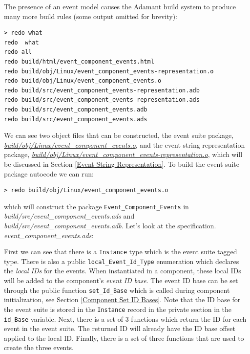 The presence of an event model causes the Adamant build system to produce many more build rules (some output omitted for brevity):

\vspace{5mm} %
\begin{verbatim}
> redo what 
redo  what
redo all
redo build/html/event_component_events.html
redo build/obj/Linux/event_component_events-representation.o
redo build/obj/Linux/event_component_events.o
redo build/src/event_component_events-representation.adb
redo build/src/event_component_events-representation.ads
redo build/src/event_component_events.adb
redo build/src/event_component_events.ads
\end{verbatim}
\vspace{5mm} %

We can see two object files that can be constructed, the event suite package, \textit{\url{build/obj/Linux/event\_component\_events.o}}, and the event string representation package, \textit{\url{build/obj/Linux/event\_component\_events-representation.o}}, which will be discussed in Section \ref{Event String Representation}. To build the event suite package autocode we can run:

\vspace{5mm} %
\begin{verbatim}
> redo build/obj/Linux/event_component_events.o
\end{verbatim}
\vspace{5mm} %

which will construct the package \texttt{Event\_Component\_Events} in \textit{build/src/event\_component\_events.ads} and \textit{build/src/event\_component\_events.adb}. Let's look at the specification. \\

\textit{event\_component\_events.ads}:

First we can see that there is a \texttt{Instance} type which is the event suite tagged type. There is also a public \texttt{local\_Event\_Id\_Type} enumeration which declares the \textit{local IDs} for the events. When instantiated in a component, these local IDs will be added to the component's \textit{event ID base}. The event ID base can be set through the public function \texttt{set\_Id\_Base} which is called during component initialization, see Section \ref{Component Set ID Bases}. Note that the ID base for the event suite is stored in the \texttt{Instance} record in the private section in the \texttt{id\_Base} variable. Next, there is a set of 3 functions which return the ID for each event in the event suite. The returned ID will already have the ID base offset applied to the local ID. Finally, there is a set of three functions that are used to create the three events. \\


